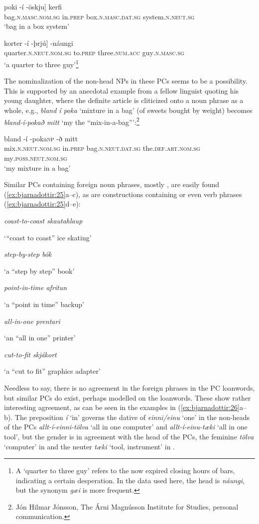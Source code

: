 \documentclass[output=paper]{LSP/langsci}
\begin{document}
\begin{xlist}
\ex
\gll {\ob}poki -í -öskju] kerfi\\
  bag\textsc{.n.masc.nom.sg} in\textsc{.prep} box\textsc{.n.masc.dat.sg} system\textsc{.n.neut.sg}\\
\glt ‘bag in a box system’

\ex
\gll {\ob}korter -í -þrjú] -náungi    \\
  quarter\textsc{.n.neut.nom.sg} to\textsc{.prep} three\textsc{.num.acc}  guy\textsc{.n.masc.sg}\\
\glt ‘a quarter to three guy’\footnote{A ‘quarter to three guy’ refers to the now expired closing hours of  bars, indicating a certain desperation. In the data used here, the head is \textit{náungi}, but the synonym \textit{gæi} is more frequent.}
\z
\z

The nominalization of the non-head NPs in these PCs seems to be a possibility. This is supported by an anecdotal example from a fellow linguist quoting his young daughter, where the definite article is cliticized onto a noun phrase as a whole, e.g., \textit{bland í poka} ‘mixture in a bag’ (of sweets bought by weight) becomes \textit{bland-í-pokað mitt} ‘my the “mix-in-a-bag”’:\footnote{Jón Hilmar Jónsson, The Árni Magnússon Institute for  Studies, personal communication.}

\ea%
 \label{ex:bjarnadottir:24}
\ea
\gll {\ob}bland -í -poka{\cb}\textsc{np} -ð mitt\\ 
  mix\textsc{.n.neut.nom.sg} in\textsc{.prep} bag\textsc{.n.neut.dat.sg} the\textsc{.def.art.nom.sg}  my\textsc{.poss.neut.nom.sg}\\
\glt ‘my mixture in a bag’
\z
\z

Similar PCs containing foreign noun phrases, mostly , are easily found (\ref{ex:bjarnadottir:25}a–c),  as are constructions containing  or even verb phrases (\ref{ex:bjarnadottir:25}d–e):

\ea%
 \label{ex:bjarnadottir:25} 
\ea \parbox{5cm}{\textit{coast-to-coast skautahlaup}} ‘“coast to coast” ice skating’
\ex \parbox{5cm}{\textit{step-by-step bók}} ‘a “step by step” book’
\ex \parbox{5cm}{\textit{point-in-time afritun}} ‘a “point in time” backup’
\ex \parbox{5cm}{\textit{all-in-one prentari}} ‘an “all in one” printer’  
\ex \parbox{5cm}{\textit{cut-to-fit skjákort}} ‘a “cut to fit” graphics adapter’
\z
\z

Needless to say, there is no agreement in the foreign phrases in the PC loanwords, but similar  PCs do exist, perhaps modelled on the loanwords. These show rather interesting agreement, as can be seen in the examples in (\ref{ex:bjarnadottir:26}a–b). The preposition \textit{í} ‘in’ governs the dative of \textit{einni/einu} ‘one’ in the non-heads of the PCs \textit{allt-í-einni-tölva} ‘all in one computer’ and \textit{allt-í-einu-tæki} ‘all in one tool’, but the gender is in agreement with the head of the PCs, the feminine \textit{tölva} ‘computer’ in  and the neuter \textit{tæki} ‘tool, instrument’ in .


\end{xlist}
\end{document}
